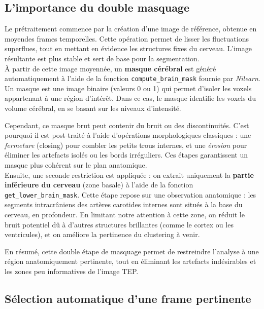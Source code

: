 \documentclass{article}
\begin{document}
    \subsection*{L'importance du double masquage}

        \noindent
        Le prétraitement commence par la création d’une image de référence, obtenue en moyendes frames temporelles. Cette opération permet de lisser les fluctuations superflues, tout en mettant en évidence les structures fixes du cerveau. L’image résultante est plus stable et sert de base pour la segmentation.\\

        \noindent
        À partir de cette image moyennée, un \textbf{masque cérébral} est généré automatiquement à l’aide de la fonction \texttt{compute\_brain\_mask} fournie par \textit{Nilearn}. Un masque est une image binaire (valeurs 0 ou 1) qui permet d’isoler les voxels appartenant à une région d’intérêt. Dans ce cas, le masque identifie les voxels du volume cérébral, en se basant sur les niveaux d’intensité.

        \noindent
        Cependant, ce masque brut peut contenir du bruit ou des discontinuités. C’est pourquoi il est post-traité à l’aide d’opérations morphologiques classiques : une \textit{fermeture} (closing) pour combler les petits trous internes, et une \textit{érosion} pour éliminer les artefacts isolés ou les bords irréguliers. Ces étapes garantissent un masque plus cohérent sur le plan anatomique.\\

        \noindent
        Ensuite, une seconde restriction est appliquée : on extrait uniquement la \textbf{partie inférieure du cerveau} (zone basale) à l’aide de la fonction \texttt{get\_lower\_brain\_mask}. Cette étape repose sur une observation anatomique : les segments intracrâniens des artères carotides internes sont situés à la base du cerveau, en profondeur. En limitant notre attention à cette zone, on réduit le bruit potentiel dû à d'autres structures brillantes (comme le cortex ou les ventricules), et on améliore la pertinence du clustering à venir.

        \noindent
        En résumé, cette double étape de masquage permet de restreindre l’analyse à une région anatomiquement pertinente, tout en éliminant les artefacts indésirables et les zones peu informatives de l’image TEP.


    \subsection*{Sélection automatique d’une frame pertinente}
        
\end{document}
